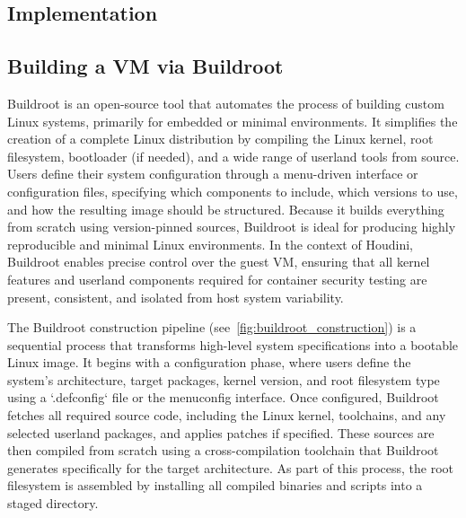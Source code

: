 \fontsize{12pt}{14pt} \selectfont
\begin{doublespace}
\chapter{Implementation}

\section{Building a VM via Buildroot}


Buildroot is an open-source tool that automates the process of building custom Linux systems, primarily for embedded or minimal environments. It simplifies the creation of a complete Linux distribution by compiling the Linux kernel, root filesystem, bootloader (if needed), and a wide range of userland tools from source. Users define their system configuration through a menu-driven interface or configuration files, specifying which components to include, which versions to use, and how the resulting image should be structured. Because it builds everything from scratch using version-pinned sources, Buildroot is ideal for producing highly reproducible and minimal Linux environments. In the context of Houdini, Buildroot enables precise control over the guest VM, ensuring that all kernel features and userland components required for container security testing are present, consistent, and isolated from host system variability.

The Buildroot construction pipeline (see~\ref{fig:buildroot_construction}) is a sequential process that transforms high-level system specifications into a bootable Linux image. It begins with a configuration phase, where users define the system's architecture, target packages, kernel version, and root filesystem type using a `.defconfig` file or the menuconfig interface. Once configured, Buildroot fetches all required source code, including the Linux kernel, toolchains, and any selected userland packages, and applies patches if specified. These sources are then compiled from scratch using a cross-compilation toolchain that Buildroot generates specifically for the target architecture. As part of this process, the root filesystem is assembled by installing all compiled binaries and scripts into a staged directory. 



\end{doublespace}
